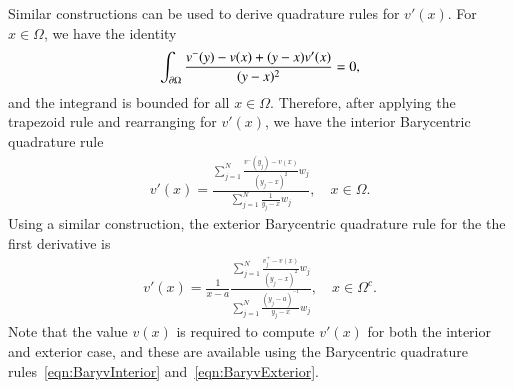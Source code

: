 \documentclass[preprint,10pt]{elsarticle}
\begin{document}
Similar constructions can be used to derive quadrature rules
for $v'(x)$.  For $x \in \Omega$, we have the identity
\begin{align}
  \int_{{\partial}\Omega} \frac{v^-(y) - v(x) + (y-x)v'(x)}{(y - x)^2} = 0,
\end{align}
and the integrand is bounded for all $x \in \Omega$.  Therefore, after
applying the trapezoid rule and rearranging for $v'(x)$, we have the
interior Barycentric quadrature rule
\begin{align}
  v'(x) = \frac{\sum\limits_{j=1}^{N}
    \frac{v^{-}(y_j) - v(x)}{(y_j-x)^2} w_j}
  {\sum\limits_{j=1}^{N} \frac{1}{y_j-x} w_j}, 
  \quad x \in \Omega.
  \label{eqn:BaryvprimeInterior}
\end{align}
Using a similar construction, the exterior Barycentric quadrature rule
for the the first derivative is
\begin{align}
  v'(x) = \frac{1}{x-a} \frac{\sum\limits_{j=1}^N
    \frac{v^+_j - v(x)}{(y_j - x)^2} w_j}
    {\sum\limits_{j=1}^N \frac{(y_j-a)^{-1}}{y_j - x} w_j},
    \quad x \in \Omega^c.
  \label{eqn:BaryvprimeExterior}
\end{align}
Note that the value $v(x)$ is required to compute $v'(x)$ for both the
interior and exterior case, and these are available using the
Barycentric quadrature rules~\eqref{eqn:BaryvInterior}
and~\eqref{eqn:BaryvExterior}.
\end{document}
